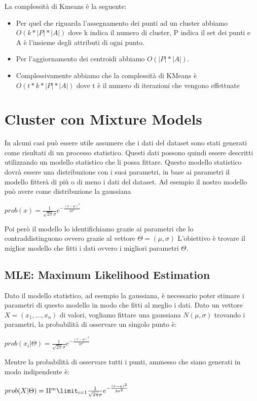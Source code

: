 \documentclass[14pt]{extreport}
\begin{document}
La complessità di Kmeans è la seguente:
\begin{itemize}
    \item Per quel che riguarda l'assegnamento dei punti ad un cluster abbiamo $O(k*|P|*|A|)$ dove k indica il numero di cluster, P indica il set dei punti e A è l'insieme degli attributi di ogni punto.
    \item Per l'aggiornamento dei centroidi abbiamo $O(|P|*|A|)$.
    \item Complessivamente abbiamo che la complessità di KMeans è $O(t*k*|P|*|A|)$ dove t è il numero di iterazioni che vengono effettuate
\end{itemize}

\section{Cluster con Mixture Models}

In alcuni casi può essere utile assumere che i dati del dataset sono stati generati come risultati di un processo statistico. Questi dati possono quindi essere descritti utilizzando un modello statistico che li possa fittare. 
Questo modello statistico dovrà essere una distribuzione con i suoi parametri, in base ai parametri il modello fitterà di più o di meno i dati del dataset.
Ad esempio il nostro modello può avere come distribuzione la gaussiana 
\newline
\centerline{$prob(x) = \frac{1}{\sqrt{2\pi}\sigma}e^{-\frac{(x-\mu)^2}{2\sigma^2}}$}

Poi però il modello lo identifichiamo grazie ai parametri che lo contraddistinguono ovvero grazie al vettore $\Theta =(\mu,\sigma)$
L'obiettivo è trovare il miglior modello che fitti i dati ovvero i migliori parametri $\Theta$.

\subsection{MLE: Maximum Likelihood Estimation}

Dato il modello statistico, ad esempio la gaussiana, è necessario poter stimare i parametri di questo modello in modo che fitti al meglio i dati.
Dato un vettore $X = (x_1,...,x_n)$ di valori, vogliamo fittare una gaussiana $N(\mu,\sigma)$ trovando i parametri, la probabilità di osservare un singolo punto è:
\newline
\centerline{$prob(x_i|\Theta) = \frac{1}{\sqrt{2\pi}\sigma}e^{-\frac{(x-\mu)^2}{2\sigma^2}}$}

Mentre la probabilità di osservare tutti i punti, ammesso che siano generati in modo indipendente è:
\newline 
\centerline{$prob(X|\Theta) = \Pi^m \limit_{i=1} \frac{1}{\sqrt{2\pi}\sigma}e^{-\frac{(x-\mu)^2}{2\sigma^2}}$}
\end{document}
